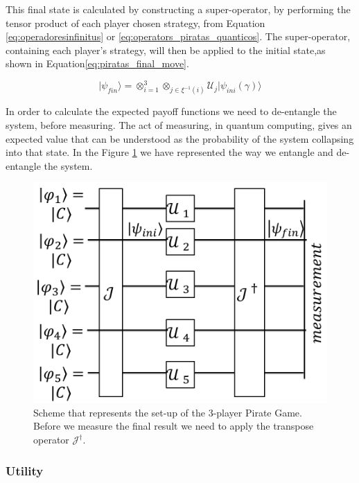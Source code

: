 \documentclass[10pt,twocolumn]{llncs}
\begin{document}
This final state is calculated by constructing a super-operator, by performing the tensor product of each player chosen strategy, from Equation \ref{eq:operadoresinfinitus} or \ref{eq:operators_piratas_quanticos}. The super-operator, containing each player's strategy, will then be applied to the initial state,as shown in Equation\ref{eq:piratas_final_move}.

\begin{equation}
\vert\psi_{fin}\rangle=\otimes_{i=1}^{3}\otimes_{j\in\xi^{-1}(i)}\mathcal{U}_{j}\vert\psi_{ini}(\gamma)\rangle
\label{eq:piratas_final_move}
\end{equation}


In order to calculate the expected payoff functions we need to de-entangle the system, before measuring. The act of measuring, in quantum computing, gives an expected value that can be understood as the probability of the system collapsing into that state. In the Figure \ref{fig:pg_architecture3players} we have represented the way we entangle and de-entangle the system.

\begin{figure}[h]
\centering 
\includegraphics[scale=0.14]{Figures/architecture/esquema/esquema.png}
\caption{Scheme that represents the set-up of the $3$-player Pirate Game. Before we measure the final result we need to apply the transpose operator $\mathcal{J}^{\dagger}$. }
\label{fig:pg_architecture3players}
\end{figure}






\subsubsection{Utility}
\label{subsec:pirates_utility}
\end{document}
